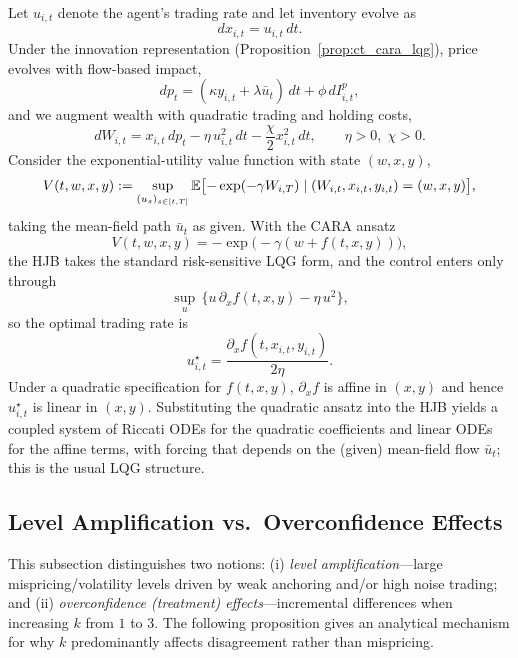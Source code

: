 Let $u_{i,t}$ denote the agent's trading rate and let inventory evolve as
\begin{equation}
dx_{i,t}=u_{i,t}\,dt.
\end{equation}
Under the innovation representation (Proposition~\ref{prop:ct_cara_lqg}), price evolves with flow-based impact,
\begin{equation}
dp_t = (\kappa y_{i,t}+\lambda \bar u_t)\,dt+\phi\,dI^p_{i,t},
\end{equation}
and we augment wealth with quadratic trading and holding costs,
\begin{equation}
dW_{i,t}=x_{i,t}\,dp_t-\eta\,u_{i,t}^2\,dt-\frac{\chi}{2}x_{i,t}^2\,dt,
\qquad \eta>0,\;\chi>0.
\end{equation}
Consider the exponential-utility value function with state $(w,x,y)$,
\[
V(t,w,x,y):=\sup_{(u_s)_{s\in[t,T]}} \mathbb{E}\bigl[-\exp(-\gamma W_{i,T})\mid (W_{i,t},x_{i,t},y_{i,t})=(w,x,y)\bigr],
\]
taking the mean-field path $\bar u_t$ as given. With the CARA ansatz
\[
V(t,w,x,y)=-\exp\bigl(-\gamma(w+f(t,x,y))\bigr),
\]
the HJB takes the standard risk-sensitive LQG form, and the control enters only through
\[
\sup_{u}\,\bigl\{u\,\partial_x f(t,x,y)-\eta\,u^2\bigr\},
\]
so the optimal trading rate is
\begin{equation}
u_{i,t}^\star=\frac{\partial_x f(t,x_{i,t},y_{i,t})}{2\eta}.
\end{equation}
Under a quadratic specification for $f(t,x,y)$, $\partial_x f$ is affine in $(x,y)$ and hence $u_{i,t}^\star$ is linear in $(x,y)$. Substituting the quadratic ansatz into the HJB yields a coupled system of Riccati ODEs for the quadratic coefficients and linear ODEs for the affine terms, with forcing that depends on the (given) mean-field flow $\bar u_t$; this is the usual LQG structure.

\subsection{Level Amplification vs.\ Overconfidence Effects}
\label{subsec:amplification}

This subsection distinguishes two notions: (i) \emph{level amplification}---large mispricing/volatility levels driven by weak anchoring and/or high noise trading; and (ii) \emph{overconfidence (treatment) effects}---incremental differences when increasing $k$ from $1$ to $3$. The following proposition gives an analytical mechanism for why $k$ predominantly affects disagreement rather than mispricing.

